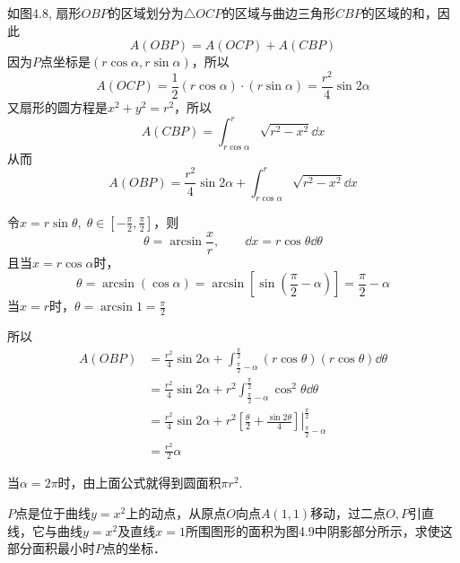 \begin{figure}[htp]
    \centering
{}
    \caption{}
\end{figure}

\begin{solution}
    如图4.8, 扇形$OBP$的区域划分为$\triangle OCP$的区域与曲边三角形$CBP$的区域的和，因此
\[A (OBP) =A (OCP) +A (CBP) \]
因为$P$点坐标是$(r\cos\alpha, r\sin\alpha)$，所以
\[A(OCP)=\frac{1}{2}(r\cos\alpha)\cdot (r\sin\alpha)=\frac{r^2}{4}\sin 2\alpha\]
又扇形的圆方程是$x^2+y^2=r^2$，所以
\[A(CBP)=\int^r_{r\cos \alpha}\sqrt{r^2-x^2}\dd x\]
从而
\[A(OBP)=\frac{r^2}{4}\sin2\alpha+\int^r_{r\cos \alpha}\sqrt{r^2-x^2}\dd x\]

令$x=r\sin\theta,\; \theta\in\left[-\frac{\pi}{2},\frac{\pi}{2}\right]$，则
\[\theta=\arcsin\frac{x}{r},\qquad \dd x=r\cos\theta \dd\theta\]
且当$x=r\cos \alpha$时，
\[\theta=\arcsin(\cos\alpha)=\arcsin\left[\sin\left(\frac{\pi}{2}-\alpha\right)\right]=\frac{\pi}{2}-\alpha\]
当$x=r$时，$\theta=\arcsin 1=\frac{\pi}{2}$

所以
\[\begin{split}
    A(OBP)&=\frac{r^2}{4}\sin2\alpha+\int^{\tfrac{\pi}{2}}_{\tfrac{\pi}{2}-\alpha}(r\cos\theta)(r\cos\theta)\dd \theta\\
&=\frac{r^2}{4}\sin2\alpha+r^2\int^{\tfrac{\pi}{2}}_{\tfrac{\pi}{2}-\alpha}\cos^2\theta\dd\theta\\ 
&=\frac{r^2}{4}\sin2\alpha+r^2\left.\left[\frac{\theta}{2}+\frac{\sin 2\theta}{4}\right]\right|^{\tfrac{\pi}{2}}_{\tfrac{\pi}{2}-\alpha}\\
&=\frac{r^2}{2}\alpha
\end{split}\]

当$\alpha=2\pi$时，由上面公式就得到圆面积$\pi r^2$.
\end{solution}

\begin{example}
$P$点是位于曲线$y=x^2$上的动点，从原点$O$向点$A(1, 1)$移动，过二点$O,P$引直线，它与曲线$y=x^2$及直线$x=1$所围图形的面积为图4.9中阴影部分所示，求使这部分面积最小时$P$点的坐标．
\end{example}

